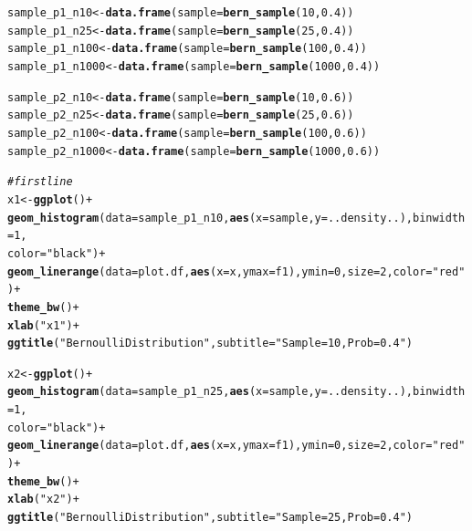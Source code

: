 \documentclass{article}\usepackage[]{graphicx}\usepackage[]{color}
\makeatletter
\newcommand{\hlnum}[1]{\textcolor[rgb]{0.686,0.059,0.569}{#1}}%
\newcommand{\hlstr}[1]{\textcolor[rgb]{0.192,0.494,0.8}{#1}}%
\newcommand{\hlcom}[1]{\textcolor[rgb]{0.678,0.584,0.686}{\textit{#1}}}%
\newcommand{\hlopt}[1]{\textcolor[rgb]{0,0,0}{#1}}%
\newcommand{\hlstd}[1]{\textcolor[rgb]{0.345,0.345,0.345}{#1}}%
\newcommand{\hlkwb}[1]{\textcolor[rgb]{0.69,0.353,0.396}{#1}}%
\newcommand{\hlkwc}[1]{\textcolor[rgb]{0.333,0.667,0.333}{#1}}%
\newcommand{\hlkwd}[1]{\textcolor[rgb]{0.737,0.353,0.396}{\textbf{#1}}}%
\newenvironment{kframe}{%
 \def\at@end@of@kframe{}%
 \ifinner\ifhmode%
  \def\at@end@of@kframe{\end{minipage}}%
  \begin{minipage}{\columnwidth}%
 \fi\fi%
 \def\FrameCommand##1{\hskip\@totalleftmargin \hskip-\fboxsep
 \colorbox{shadecolor}{##1}\hskip-\fboxsep
     \hskip-\linewidth \hskip-\@totalleftmargin \hskip\columnwidth}%
 \MakeFramed {\advance\hsize-\width
   \@totalleftmargin\z@ \linewidth\hsize
   \@setminipage}}%
 {\par\unskip\endMakeFramed%
 \at@end@of@kframe}
\newenvironment{knitrout}{}{} %
\makeatother
\begin{document}
\begin{enumerate}
\begin{enumerate}
\begin{knitrout}
\begin{kframe}
\begin{alltt}
\hlstd{sample_p1_n10} \hlkwb{<-} \hlkwd{data.frame}\hlstd{(}\hlkwc{sample} \hlstd{=} \hlkwd{bern_sample}\hlstd{(}\hlnum{10}\hlstd{,} \hlnum{0.4}\hlstd{))}
\hlstd{sample_p1_n25} \hlkwb{<-} \hlkwd{data.frame}\hlstd{(}\hlkwc{sample} \hlstd{=} \hlkwd{bern_sample}\hlstd{(}\hlnum{25}\hlstd{,} \hlnum{0.4}\hlstd{))}
\hlstd{sample_p1_n100} \hlkwb{<-} \hlkwd{data.frame}\hlstd{(}\hlkwc{sample} \hlstd{=} \hlkwd{bern_sample}\hlstd{(}\hlnum{100}\hlstd{,} \hlnum{0.4}\hlstd{))}
\hlstd{sample_p1_n1000}\hlkwb{<-} \hlkwd{data.frame}\hlstd{(}\hlkwc{sample} \hlstd{=} \hlkwd{bern_sample}\hlstd{(}\hlnum{1000}\hlstd{,} \hlnum{0.4}\hlstd{))}

\hlstd{sample_p2_n10} \hlkwb{<-} \hlkwd{data.frame}\hlstd{(}\hlkwc{sample} \hlstd{=} \hlkwd{bern_sample}\hlstd{(}\hlnum{10}\hlstd{,} \hlnum{0.6}\hlstd{))}
\hlstd{sample_p2_n25} \hlkwb{<-} \hlkwd{data.frame}\hlstd{(}\hlkwc{sample} \hlstd{=} \hlkwd{bern_sample}\hlstd{(}\hlnum{25}\hlstd{,} \hlnum{0.6}\hlstd{))}
\hlstd{sample_p2_n100} \hlkwb{<-} \hlkwd{data.frame}\hlstd{(}\hlkwc{sample} \hlstd{=} \hlkwd{bern_sample}\hlstd{(}\hlnum{100}\hlstd{,} \hlnum{0.6}\hlstd{))}
\hlstd{sample_p2_n1000}\hlkwb{<-} \hlkwd{data.frame}\hlstd{(}\hlkwc{sample} \hlstd{=} \hlkwd{bern_sample}\hlstd{(}\hlnum{1000}\hlstd{,} \hlnum{0.6}\hlstd{))}


\hlcom{#first line}
          \hlstd{x1}\hlkwb{<-}\hlkwd{ggplot}\hlstd{()}\hlopt{+}
          \hlkwd{geom_histogram}\hlstd{(}\hlkwc{data} \hlstd{= sample_p1_n10,} \hlkwd{aes}\hlstd{(}\hlkwc{x} \hlstd{= sample,} \hlkwc{y}\hlstd{=..density..),} \hlkwc{binwidth}\hlstd{=}\hlnum{1}\hlstd{,}
                         \hlkwc{color}\hlstd{=}\hlstr{"black"}\hlstd{)}\hlopt{+}
          \hlkwd{geom_linerange}\hlstd{(}\hlkwc{data}\hlstd{=plot.df,} \hlkwd{aes}\hlstd{(}\hlkwc{x}\hlstd{=x,} \hlkwc{ymax} \hlstd{= f1),} \hlkwc{ymin} \hlstd{=} \hlnum{0}\hlstd{,} \hlkwc{size}\hlstd{=}\hlnum{2}\hlstd{,} \hlkwc{color}\hlstd{=}\hlstr{"red"}\hlstd{)}\hlopt{+}
          \hlkwd{theme_bw}\hlstd{()} \hlopt{+}
          \hlkwd{xlab}\hlstd{(}\hlstr{"x1"}\hlstd{)}\hlopt{+}
          \hlkwd{ggtitle}\hlstd{(}\hlstr{"Bernoulli Distribution"}\hlstd{,}\hlkwc{subtitle} \hlstd{=} \hlstr{"Sample = 10, Prob =0.4"}\hlstd{)}

                \hlstd{x2}\hlkwb{<-}\hlkwd{ggplot}\hlstd{()}\hlopt{+}
          \hlkwd{geom_histogram}\hlstd{(}\hlkwc{data} \hlstd{= sample_p1_n25,} \hlkwd{aes}\hlstd{(}\hlkwc{x} \hlstd{= sample,} \hlkwc{y}\hlstd{=..density..),} \hlkwc{binwidth}\hlstd{=}\hlnum{1}\hlstd{,}
                         \hlkwc{color}\hlstd{=}\hlstr{"black"}\hlstd{)}\hlopt{+}
          \hlkwd{geom_linerange}\hlstd{(}\hlkwc{data}\hlstd{=plot.df,} \hlkwd{aes}\hlstd{(}\hlkwc{x}\hlstd{=x,} \hlkwc{ymax} \hlstd{= f1),} \hlkwc{ymin} \hlstd{=} \hlnum{0}\hlstd{,} \hlkwc{size}\hlstd{=}\hlnum{2}\hlstd{,} \hlkwc{color}\hlstd{=}\hlstr{"red"}\hlstd{)}\hlopt{+}
          \hlkwd{theme_bw}\hlstd{()} \hlopt{+}
          \hlkwd{xlab}\hlstd{(}\hlstr{"x2"}\hlstd{)}\hlopt{+}
          \hlkwd{ggtitle}\hlstd{(}\hlstr{"Bernoulli Distribution"}\hlstd{,}\hlkwc{subtitle} \hlstd{=} \hlstr{"Sample = 25, Prob =0.4"}\hlstd{)}


\end{alltt}
\end{kframe}
\end{knitrout}
\end{enumerate}
\end{enumerate}
\end{document}

